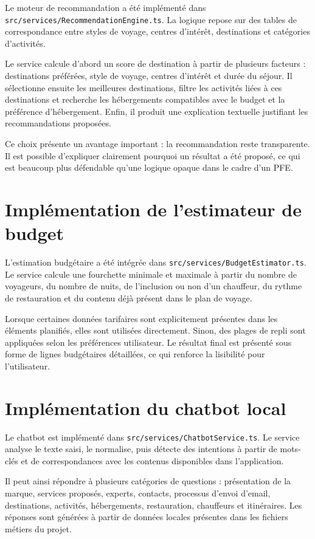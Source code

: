 \documentclass[12pt,a4paper]{report}
\begin{document}
Le moteur de recommandation a été implémenté dans \texttt{src/services/RecommendationEngine.ts}. La logique repose sur des tables de correspondance entre styles de voyage, centres d'intérêt, destinations et catégories d'activités.

Le service calcule d'abord un score de destination à partir de plusieurs facteurs : destinations préférées, style de voyage, centres d'intérêt et durée du séjour. Il sélectionne ensuite les meilleures destinations, filtre les activités liées à ces destinations et recherche les hébergements compatibles avec le budget et la préférence d'hébergement. Enfin, il produit une explication textuelle justifiant les recommandations proposées.

Ce choix présente un avantage important : la recommandation reste transparente. Il est possible d'expliquer clairement pourquoi un résultat a été proposé, ce qui est beaucoup plus défendable qu'une logique opaque dans le cadre d'un PFE.

\section{Implémentation de l'estimateur de budget}

L'estimation budgétaire a été intégrée dans \texttt{src/services/BudgetEstimator.ts}. Le service calcule une fourchette minimale et maximale à partir du nombre de voyageurs, du nombre de nuits, de l'inclusion ou non d'un chauffeur, du rythme de restauration et du contenu déjà présent dans le plan de voyage.

Lorsque certaines données tarifaires sont explicitement présentes dans les éléments planifiés, elles sont utilisées directement. Sinon, des plages de repli sont appliquées selon les préférences utilisateur. Le résultat final est présenté sous forme de lignes budgétaires détaillées, ce qui renforce la lisibilité pour l'utilisateur.

\section{Implémentation du chatbot local}

Le chatbot est implémenté dans \texttt{src/services/ChatbotService.ts}. Le service analyse le texte saisi, le normalise, puis détecte des intentions à partir de mots-clés et de correspondances avec les contenus disponibles dans l'application.

Il peut ainsi répondre à plusieurs catégories de questions : présentation de la marque, services proposés, experts, contacts, processus d'envoi d'email, destinations, activités, hébergements, restauration, chauffeurs et itinéraires. Les réponses sont générées à partir de données locales présentes dans les fichiers métiers du projet.
\end{document}
